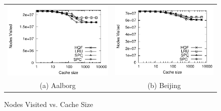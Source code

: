 \begin{figure}[htb]
\center
  \begin{tabular}{@{}c@{ }c@{}}
     \includegraphics[width=0.5\columnwidth]{figures/cachesize_nodes_aal.pdf}
     &
     \includegraphics[width=0.5\columnwidth]{figures/cachesize_nodes_bei.pdf}
      \\
     (a) Aalborg & (b)  Beijing
     \end{tabular}
\caption{Nodes Visited vs. Cache Size}
\label{fig:cacheSizeVsNodesvisited}
\end{figure}
